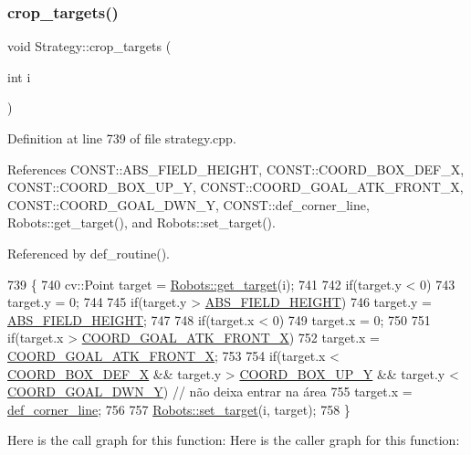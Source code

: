 \subsubsection{\texorpdfstring{crop\+\_\+targets()}{crop\_targets()}}
{\footnotesize\ttfamily void Strategy\+::crop\+\_\+targets (\begin{DoxyParamCaption}\item[{int}]{i }\end{DoxyParamCaption})}



Definition at line 739 of file strategy.\+cpp.



References C\+O\+N\+S\+T\+::\+A\+B\+S\+\_\+\+F\+I\+E\+L\+D\+\_\+\+H\+E\+I\+G\+HT, C\+O\+N\+S\+T\+::\+C\+O\+O\+R\+D\+\_\+\+B\+O\+X\+\_\+\+D\+E\+F\+\_\+X, C\+O\+N\+S\+T\+::\+C\+O\+O\+R\+D\+\_\+\+B\+O\+X\+\_\+\+U\+P\+\_\+Y, C\+O\+N\+S\+T\+::\+C\+O\+O\+R\+D\+\_\+\+G\+O\+A\+L\+\_\+\+A\+T\+K\+\_\+\+F\+R\+O\+N\+T\+\_\+X, C\+O\+N\+S\+T\+::\+C\+O\+O\+R\+D\+\_\+\+G\+O\+A\+L\+\_\+\+D\+W\+N\+\_\+Y, C\+O\+N\+S\+T\+::def\+\_\+corner\+\_\+line, Robots\+::get\+\_\+target(), and Robots\+::set\+\_\+target().



Referenced by def\+\_\+routine().


\begin{DoxyCode}
739                                  \{
740     cv::Point target = \hyperlink{class_robots_a8a4fe339df4823e45cf34d9fb8daa64b}{Robots::get\_target}(i);
741 
742     \textcolor{keywordflow}{if}(target.y < 0)
743         target.y = 0;
744 
745     \textcolor{keywordflow}{if}(target.y > \hyperlink{namespace_c_o_n_s_t_a42a76a781b7cd424616b37ec9d720f98}{ABS\_FIELD\_HEIGHT})
746         target.y = \hyperlink{namespace_c_o_n_s_t_a42a76a781b7cd424616b37ec9d720f98}{ABS\_FIELD\_HEIGHT};
747 
748     \textcolor{keywordflow}{if}(target.x < 0)
749         target.x = 0;
750 
751     \textcolor{keywordflow}{if}(target.x > \hyperlink{namespace_c_o_n_s_t_a8788c5d888fd3e9d9382502aee24afee}{COORD\_GOAL\_ATK\_FRONT\_X})
752         target.x = \hyperlink{namespace_c_o_n_s_t_a8788c5d888fd3e9d9382502aee24afee}{COORD\_GOAL\_ATK\_FRONT\_X};
753 
754     \textcolor{keywordflow}{if}(target.x < \hyperlink{namespace_c_o_n_s_t_a7d27201b3e7475f3c8141242fa75a026}{COORD\_BOX\_DEF\_X} && target.y > \hyperlink{namespace_c_o_n_s_t_a5183cf5159cdc31e5b55d6d97d0854e4}{COORD\_BOX\_UP\_Y} && target.y < 
      \hyperlink{namespace_c_o_n_s_t_a97382a534273f1ca10b7cdf29fab9d0a}{COORD\_GOAL\_DWN\_Y}) \textcolor{comment}{// não deixa entrar na área}
755         target.x = \hyperlink{namespace_c_o_n_s_t_a1ceb4c2871b41b2f17d5bff1e40e9dd0}{def\_corner\_line};
756 
757     \hyperlink{class_robots_ac1cd5c41b6e5d5643b2186ca51699c8f}{Robots::set\_target}(i, target);
758 \}
\end{DoxyCode}
Here is the call graph for this function\+:
Here is the caller graph for this function\+:
\mbox{\label{class_strategy_a304c52736ec76d275adda7eeacdd430c}} 

